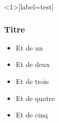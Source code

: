 \documentclass{beamer}
\begin{document}
\begin{frame}<1>[label=test]
\frametitle{Titre}
\beamerdefaultoverlayspecification{<+->} 
\begin{itemize}
     \item Et de un
     \item Et de deux
     \item Et de trois
     \item Et de quatre
     \item Et de cinq
\end{itemize}
\end{frame}

\end{document}
